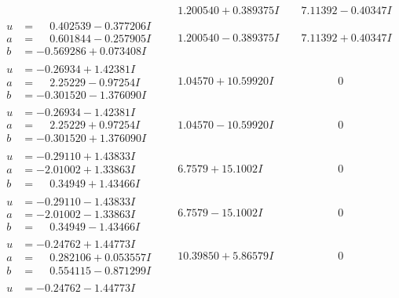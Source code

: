 \documentclass[1p]{elsarticle_modified}
\theoremstyle{definition}
\begin{document}
$$\begin{array}{c|c|c}
 & \phantom{-}1.200540 + 0.389375 I & \phantom{-}7.11392 - 0.40347 I \\ \hline\begin{aligned}
u &= \phantom{-}0.402539 - 0.377206 I \\
a &= \phantom{-}0.601844 - 0.257905 I \\
b &= -0.569286 + 0.073408 I\end{aligned}
 & \phantom{-}1.200540 - 0.389375 I & \phantom{-}7.11392 + 0.40347 I \\ \hline\begin{aligned}
u &= -0.26934 + 1.42381 I \\
a &= \phantom{-}2.25229 - 0.97254 I \\
b &= -0.301520 - 1.376090 I\end{aligned}
 & \phantom{-}1.04570 + 10.59920 I & \phantom{-0.000000 } 0 \\ \hline\begin{aligned}
u &= -0.26934 - 1.42381 I \\
a &= \phantom{-}2.25229 + 0.97254 I \\
b &= -0.301520 + 1.376090 I\end{aligned}
 & \phantom{-}1.04570 - 10.59920 I & \phantom{-0.000000 } 0 \\ \hline\begin{aligned}
u &= -0.29110 + 1.43833 I \\
a &= -2.01002 + 1.33863 I \\
b &= \phantom{-}0.34949 + 1.43466 I\end{aligned}
 & \phantom{-}6.7579 + 15.1002 I & \phantom{-0.000000 } 0 \\ \hline\begin{aligned}
u &= -0.29110 - 1.43833 I \\
a &= -2.01002 - 1.33863 I \\
b &= \phantom{-}0.34949 - 1.43466 I\end{aligned}
 & \phantom{-}6.7579 - 15.1002 I & \phantom{-0.000000 } 0 \\ \hline\begin{aligned}
u &= -0.24762 + 1.44773 I \\
a &= \phantom{-}0.282106 + 0.053557 I \\
b &= \phantom{-}0.554115 - 0.871299 I\end{aligned}
 & \phantom{-}10.39850 + 5.86579 I & \phantom{-0.000000 } 0 \\ \hline\begin{aligned}
u &= -0.24762 - 1.44773 I \\

\end{aligned}
\end{array}$$
\end{document}
